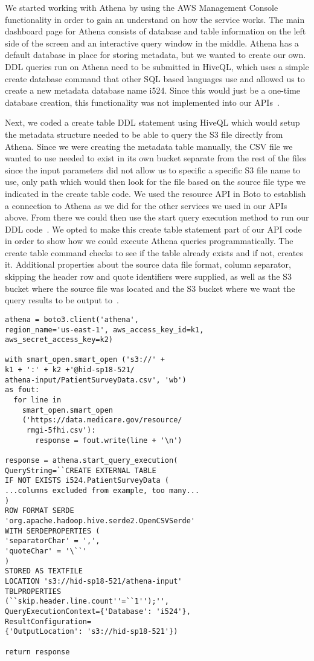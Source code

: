 We started working with Athena by using the AWS Management Console 
functionality in order to gain an understand on how the service works. 
The main dashboard page for Athena consists of database and table information 
on the left side of the screen and an interactive query window in the middle. 
Athena has a default database in place for storing metadata, but we wanted to 
create our own. DDL queries run on Athena need to be submitted in 
HiveQL, which uses a simple create database command that other SQL based 
languages use and allowed us to create a new metadata database name i524. 
Since this would just be a one-time database creation, this functionality was 
not implemented into our APIs~\cite{hid-sp18-521-whatisathena}. 

Next, we coded a create table DDL statement using HiveQL which would setup the 
metadata structure needed to be able to query the S3 file directly from 
Athena. Since we were creating the metadata table manually, the CSV file we 
wanted to use needed to exist in its own bucket separate from the rest of the 
files since the input parameters did not allow us to specific a specific S3 
file name to use, only path which would then look for the file based on the 
source file type we indicated in the create table code. We used the resource 
API in Boto to establish a connection to Athena as we did for the other 
services we used in our APIs above. From there we could then use the 
start query execution method to run our DDL 
code~\cite{hid-sp18-521-boto-athena}. We opted to make this create table 
statement part of our API code in order to show how we could execute Athena 
queries programmatically. The create table command checks to see if the table 
already exists and if not, creates it. Additional properties about the source 
data file format, column separator, skipping the header row and quote 
identifiers were supplied, as well as the S3 bucket where the source file was 
located and the S3 bucket where we want the query results to be output 
to~\cite{hid-sp18-521-athena-gettingstarted}. 

\begin{verbatim}
athena = boto3.client('athena', 
region_name='us-east-1', aws_access_key_id=k1,
aws_secret_access_key=k2)

with smart_open.smart_open ('s3://' + 
k1 + ':' + k2 +'@hid-sp18-521/
athena-input/PatientSurveyData.csv', 'wb') 
as fout:
  for line in 
    smart_open.smart_open
    ('https://data.medicare.gov/resource/
     rmgi-5fhi.csv'):
       response = fout.write(line + '\n')

response = athena.start_query_execution(
QueryString=``CREATE EXTERNAL TABLE 
IF NOT EXISTS i524.PatientSurveyData (
...columns excluded from example, too many...
)
ROW FORMAT SERDE 
'org.apache.hadoop.hive.serde2.OpenCSVSerde'
WITH SERDEPROPERTIES (
'separatorChar' = ',',
'quoteChar' = '\``'
)
STORED AS TEXTFILE 
LOCATION 's3://hid-sp18-521/athena-input'
TBLPROPERTIES 
(``skip.header.line.count''=``1'');'',
QueryExecutionContext={'Database': 'i524'}, 
ResultConfiguration=
{'OutputLocation': 's3://hid-sp18-521'})

return response
\end{verbatim}

